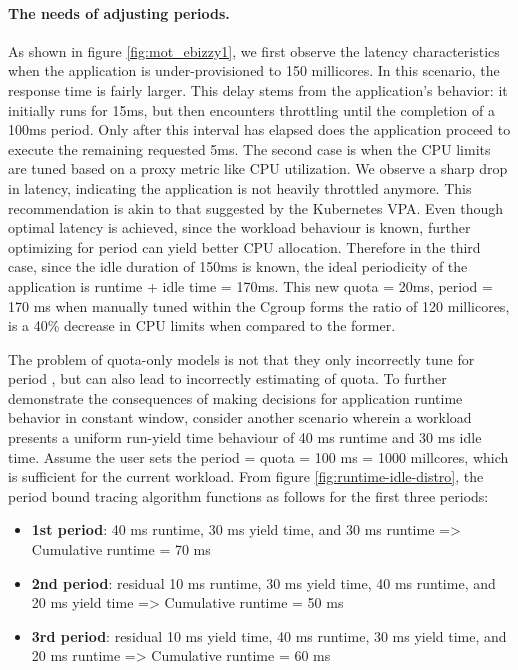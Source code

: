 \paragraph{The needs of adjusting periods.}
As shown in figure \ref{fig:mot_ebizzy1}, we first observe the latency characteristics when the application is under-provisioned to 150 millicores. In this scenario, the response time is fairly larger. This delay stems from the application's behavior: it initially runs for 15ms, but then encounters throttling until the completion of a 100ms period. Only after this interval has elapsed does the application proceed to execute the remaining requested 5ms. 
The second case is when the CPU limits are tuned based on a proxy metric like CPU utilization. We observe a sharp drop in latency, indicating the application is not heavily throttled anymore. This recommendation is akin to that suggested by the Kubernetes VPA. Even though optimal latency is achieved, since the workload behaviour is known, further optimizing for period can yield better CPU allocation. Therefore in the third case, since the idle duration of 150ms is known, the ideal periodicity of the application is runtime + idle time = 170ms. This new quota = 20ms, period = 170 ms when manually tuned within the Cgroup forms the ratio of 120 millicores, is a 40\% decrease in CPU limits when compared to the former.

The problem of quota-only models is not that they only incorrectly tune for period , but can also lead to incorrectly estimating of quota. To further demonstrate the consequences of making decisions for application runtime behavior in constant window, consider another scenario wherein a workload presents a uniform run-yield time behaviour of 40 ms runtime and 30 ms idle time. Assume the user sets the period = quota = 100 ms = 1000 millcores, which is sufficient for the current workload. From figure \ref{fig:runtime-idle-distro}, the period bound tracing algorithm functions as follows for the first three periods:
\begin{itemize}
    \item\textbf{1st period}: 40 ms runtime, 30 ms yield time, and 30 ms runtime => Cumulative runtime = 70 ms
    \item\textbf{2nd period}: residual 10 ms runtime, 30 ms yield time, 40 ms runtime, and 20 ms yield time => Cumulative runtime = 50 ms
    \item\textbf{3rd period}: residual 10 ms yield time, 40 ms runtime, 30 ms yield time, and 20 ms runtime => Cumulative runtime = 60 ms
\end{itemize}


